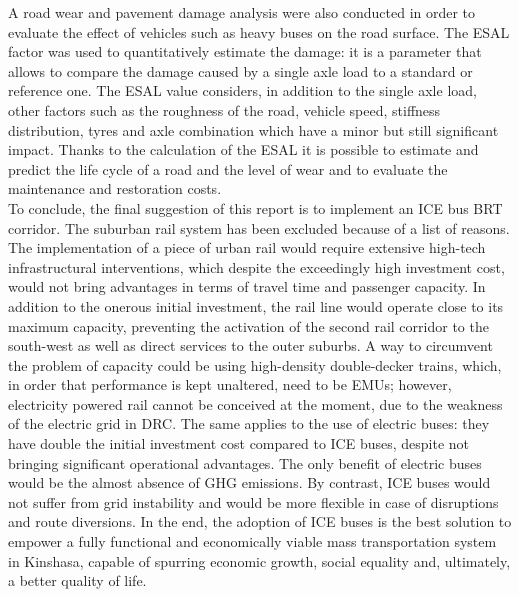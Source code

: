 \documentclass{article}
\begin{document}
A road wear and pavement damage analysis were also conducted in order to evaluate the effect of vehicles such as heavy buses on the road surface. The ESAL factor was used to quantitatively estimate the damage: it is a parameter that allows to compare the damage caused by a single axle load to a standard or reference one. The ESAL value considers, in addition to the single axle load, other factors such as the roughness of the road, vehicle speed, stiffness distribution, tyres and axle combination which have a minor but still significant impact. Thanks to the calculation of the ESAL it is possible to estimate and predict the life cycle of a road and the level of wear and to evaluate the maintenance and restoration costs.\\

To conclude, the final suggestion of this report is to implement an ICE bus BRT corridor. The suburban rail system has been excluded because of a list of reasons. The implementation of a piece of urban rail would require extensive high-tech infrastructural interventions, which despite the exceedingly high investment cost, would not bring advantages in terms of travel time and passenger capacity. In addition to the onerous initial investment, the rail line would operate close to its maximum capacity, preventing the activation of the second rail corridor to the south-west as well as direct services to the outer suburbs. A way to circumvent the problem of capacity could be using high-density double-decker trains, which, in order that performance is kept unaltered, need to be EMUs; however, electricity powered rail cannot be conceived at the moment, due to the weakness of the electric grid in DRC. The same applies to the use of electric buses: they have double the initial investment cost compared to ICE buses, despite not bringing significant operational advantages. The only benefit of electric buses would be the almost absence of GHG emissions. By contrast, ICE buses would not suffer from grid instability and would be more flexible in case of disruptions and route diversions. In the end, the adoption of ICE buses is the best solution to empower a fully functional and economically viable mass transportation system in Kinshasa, capable of spurring economic growth, social equality and, ultimately, a better quality of life.\\
\newpage
\end{document}
